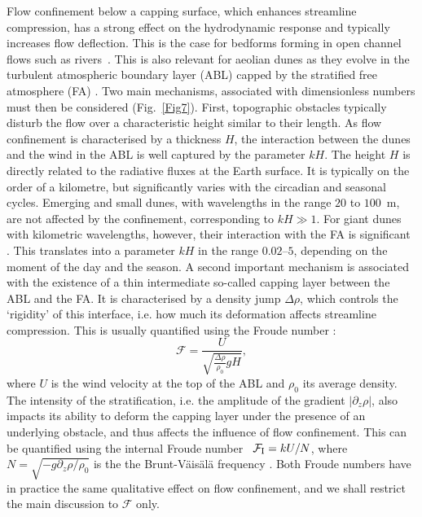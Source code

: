 Flow confinement below a capping surface, which enhances streamline compression, has a strong effect on the hydrodynamic response and typically increases flow deflection. This is the case for bedforms forming in open channel flows such as rivers~\citep{Kennedy1963, Chang1970, Mizumura1995, Colombini2004, Fourriere2010, Andreotti2012, Unsworth2018}. This is also relevant for aeolian dunes as they evolve in the turbulent atmospheric boundary layer (ABL) capped by the stratified free atmosphere (FA) \citep{Andreotti2009}. Two main mechanisms, associated with dimensionless numbers must then be considered (Fig.~\ref{Fig7}). First, topographic obstacles typically disturb the flow over a characteristic height similar to their length. As flow confinement is characterised by a thickness $H$, the interaction between the dunes and the wind in the ABL is well captured by the parameter $k H$. The height $H$ is directly related to the radiative fluxes at the Earth surface. It is typically on the order of a kilometre, but significantly varies with the circadian and seasonal cycles. Emerging and small dunes, with wavelengths in the range $20$ to $100$~m, are not affected by the confinement, corresponding to $k H \gg 1$. For giant dunes with kilometric wavelengths, however, their interaction with the FA is significant \citep{Andreotti2009}. This translates into a parameter $kH$ in the range $0.02$--$5$, depending on the moment of the day and the season. A second important mechanism is associated with the existence of a thin intermediate so-called capping layer between the ABL and the FA. It is characterised by a density jump $\Delta\rho$, which controls the `rigidity' of this interface, i.e. how much its deformation affects streamline compression. This is usually quantified using the Froude number \citep{Vosper2004, Stull2006, Sheridan2006, Hunt2006, Jiang2014}:
%
\begin{equation}
\mathcal{F} = \displaystyle\frac{U}{\sqrt{\displaystyle\frac{\Delta\rho}{\rho_{0}}gH}},
\label{FroudeNumber}
\end{equation}
%
where $U$ is the wind velocity at the top of the ABL and $\rho_{0}$ its average density. The intensity of the stratification, i.e. the amplitude of the gradient $\left | \partial_z \rho \right|$, also impacts its ability to deform the capping layer under the presence of an underlying obstacle, and thus affects the influence of flow confinement. This can be quantified using the internal Froude number~\citep{Vosper2004, Stull2006, Sheridan2006, Hunt2006, Jiang2014} $\mathcal{F}_{\textup{I}} = k U/N$, where $N = \sqrt{-g \partial_z \rho / \rho_{0}}$ is the the Brunt-V\"ais\"al\"a frequency \citep{Stull1988}. Both Froude numbers have in practice the same qualitative effect on flow confinement, and we shall restrict the main discussion to $\mathcal{F}$ only.

